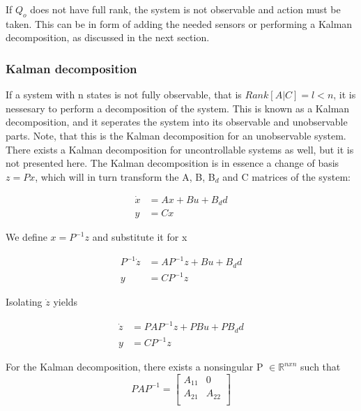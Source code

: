 If $Q_o$ does not have full rank, the system is not observable and action must be taken. This can be in form of adding the needed sensors or performing a Kalman decomposition, as discussed in the next section.\\


\subsubsection{Kalman decomposition}
\label{sec:kalman}
If a system with n states is not fully observable, that is $Rank[A|C] = l < n$, it is nessesary to perform a decomposition of the system. This is known as a Kalman decomposition, and it seperates the system into its observable and unobservable parts. Note, that this is the Kalman decomposition for an unobservable system. There exists a Kalman decomposition for uncontrollable systems as well, but it is not presented here. The Kalman decomposition is in essence a change of basis $z=Px$, which will in turn transform the A, B, B$_d$ and C matrices of the system:


\begin{equation}
	\begin{split}
		\dot{x} & = Ax + Bu + B_dd \\
		y & = Cx
	\end{split}
\end{equation}

We define $x = P^{-1}z$ and substitute it for x

\begin{equation}
	\begin{split}
		P^{-1}\dot{z} & = AP^{-1}z + Bu + B_dd \\
		y & = CP^{-1}z
	\end{split}
\end{equation}

Isolating $\dot{z}$ yields

\begin{equation}
	\begin{split}
		\dot{z} & = PAP^{-1}z + PBu + PB_dd \\
		y & = CP^{-1}z
	\end{split}
\end{equation}

For the Kalman decomposition, there exists a nonsingular P  $\in \mathbb{R} ^{n x n}$ such that
\begin{equation}
	PAP^{-1} = \begin{bmatrix}
		A_{11}       & 0 \\
		A_{21}       & A_{22} \\
	\end{bmatrix}
\end{equation}

